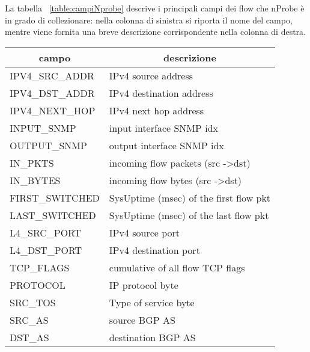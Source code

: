 \documentclass[../main.tex]{subfiles}
\begin{document}
La tabella ~\ref{table:campiNprobe} descrive i principali campi dei flow che nProbe è in grado di collezionare: nella colonna di sinistra si riporta il nome del campo, mentre viene fornita una breve descrizione corrispondente nella colonna di destra.

\begin{table}[H]
				\centering
\begin{tabular}{|l|l|}
\hline
\multicolumn{1}{|c|}{\textbf{campo}} & \multicolumn{1}{c|}{\textbf{descrizione}}     \\ \hline
IPV4\_SRC\_ADDR                      & IPv4 source address                           \\ \hline
IPV4\_DST\_ADDR                      & IPv4 destination address                      \\ \hline
IPV4\_NEXT\_HOP                      & IPv4 next hop address                         \\ \hline
INPUT\_SNMP                          & input interface SNMP idx                      \\ \hline
OUTPUT\_SNMP                         & output interface SNMP idx                     \\ \hline
IN\_PKTS                             & incoming flow packets (src -\textgreater dst) \\ \hline
IN\_BYTES                            & incoming flow bytes (src -\textgreater dst)   \\ \hline
FIRST\_SWITCHED                      & SysUptime (msec) of the first flow pkt        \\ \hline
LAST\_SWITCHED                       & SysUptime (msec) of the last flow pkt         \\ \hline
L4\_SRC\_PORT                        & IPv4 source port                              \\ \hline
L4\_DST\_PORT                        & IPv4 destination port                         \\ \hline
TCP\_FLAGS                           & cumulative of all flow TCP flags              \\ \hline
PROTOCOL                             & IP protocol byte                              \\ \hline
SRC\_TOS                             & Type of service byte                          \\ \hline
SRC\_AS                              & source BGP AS                                 \\ \hline
DST\_AS                              & destination BGP AS                            \\ \hline

\end{tabular}
\end{table}
\end{document}
